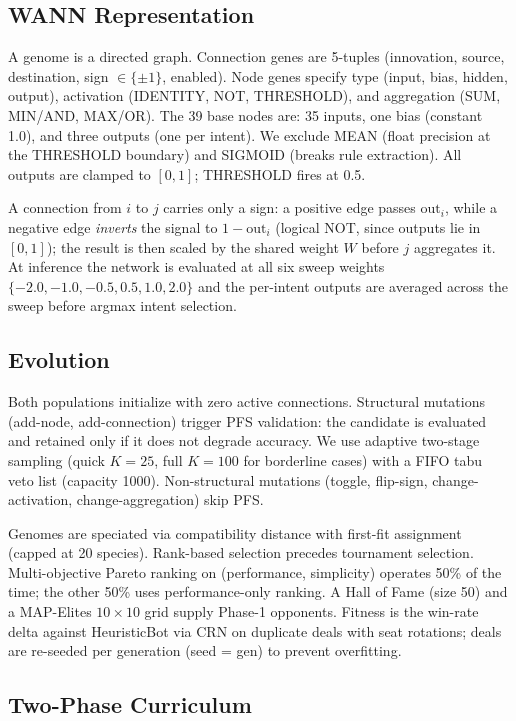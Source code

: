 \documentclass[runningheads]{llncs}
\begin{document}
\subsection{WANN Representation}

A genome is a directed graph. Connection genes are 5-tuples (innovation,
source, destination, sign $\in \{\pm1\}$, enabled). Node genes specify type
(input, bias, hidden, output), activation (IDENTITY, NOT, THRESHOLD), and
aggregation (SUM, MIN/AND, MAX/OR). The 39 base nodes are: 35 inputs, one bias
(constant 1.0), and three outputs (one per intent). We exclude MEAN (float
precision at the THRESHOLD boundary) and SIGMOID (breaks rule extraction). All
outputs are clamped to $[0,1]$; THRESHOLD fires at 0.5.

A connection from $i$ to $j$ carries only a sign: a positive edge passes
$\text{out}_i$, while a negative edge \emph{inverts} the signal to
$1-\text{out}_i$ (logical NOT, since outputs lie in $[0,1]$); the result is then
scaled by the shared weight $W$ before $j$ aggregates it. At inference the
network is evaluated at all six sweep weights
$\{-2.0, -1.0, -0.5, 0.5, 1.0, 2.0\}$ and the per-intent outputs are averaged
across the sweep before argmax intent selection.

\subsection{Evolution}

Both populations initialize with zero active connections. Structural mutations
(add-node, add-connection) trigger PFS validation: the candidate is evaluated
and retained only if it does not degrade accuracy. We use adaptive two-stage
sampling (quick $K{=}25$, full $K{=}100$ for borderline cases) with a FIFO tabu
veto list (capacity 1000). Non-structural mutations (toggle, flip-sign,
change-activation, change-aggregation) skip PFS.

Genomes are speciated via compatibility distance with first-fit assignment
(capped at 20 species). Rank-based selection precedes tournament selection.
Multi-objective Pareto ranking on (performance, simplicity) operates 50\% of
the time; the other 50\% uses performance-only ranking. A Hall of Fame (size
50) and a MAP-Elites $10\times 10$ grid supply Phase-1 opponents. Fitness is
the win-rate delta against HeuristicBot via CRN on duplicate deals with seat
rotations; deals are re-seeded per generation (seed = gen) to prevent overfitting.

\subsection{Two-Phase Curriculum}
\end{document}
